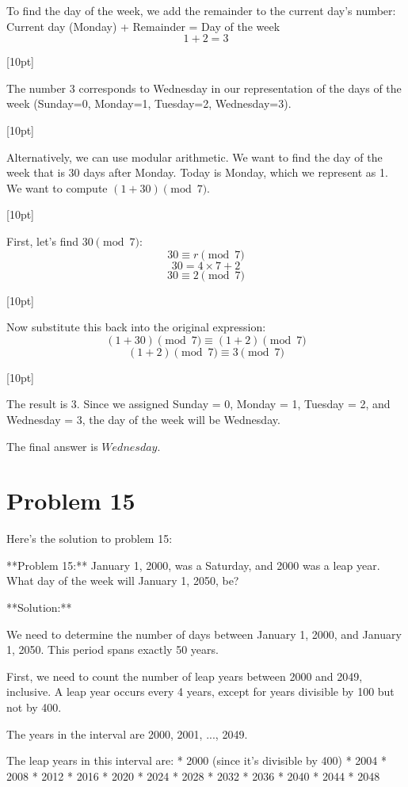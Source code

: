 \documentclass{article}
\begin{document}
To find the day of the week, we add the remainder to the current day's number:
Current day (Monday) + Remainder = Day of the week
$$1 + 2 = 3$$

[10pt]

The number 3 corresponds to Wednesday in our representation of the days of the week (Sunday=0, Monday=1, Tuesday=2, Wednesday=3).

[10pt]

Alternatively, we can use modular arithmetic. We want to find the day of the week that is 30 days after Monday.
Today is Monday, which we represent as 1.
We want to compute $(1 + 30) \pmod{7}$.

[10pt]

First, let's find $30 \pmod{7}$:
$$30 \equiv r \pmod{7}$$
$$30 = 4 \times 7 + 2$$
$$30 \equiv 2 \pmod{7}$$

[10pt]

Now substitute this back into the original expression:
$$(1 + 30) \pmod{7} \equiv (1 + 2) \pmod{7}$$
$$(1 + 2) \pmod{7} \equiv 3 \pmod{7}$$

[10pt]

The result is 3. Since we assigned Sunday = 0, Monday = 1, Tuesday = 2, and Wednesday = 3, the day of the week will be Wednesday.

The final answer is $\boxed{Wednesday}$.

\newpage

\section*{Problem 15}
Here's the solution to problem 15:

**Problem 15:** January 1, 2000, was a Saturday, and 2000 was a leap year. What day of the week will January 1, 2050, be?

**Solution:**

We need to determine the number of days between January 1, 2000, and January 1, 2050. This period spans exactly 50 years.

First, we need to count the number of leap years between 2000 and 2049, inclusive. A leap year occurs every 4 years, except for years divisible by 100 but not by 400.

The years in the interval are 2000, 2001, ..., 2049.

The leap years in this interval are:
*   2000 (since it's divisible by 400)
*   2004
*   2008
*   2012
*   2016
*   2020
*   2024
*   2028
*   2032
*   2036
*   2040
*   2044
*   2048
\end{document}
